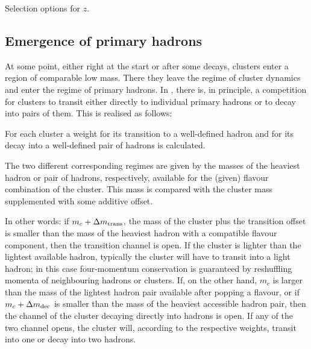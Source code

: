 \documentclass[a4paper,fleqn,10pt]{article}
\begin{document}
\begin{appendix}
\begin{table}[h!]
\begin{center}
    \parbox{12cm}{\caption{Selection options for $z$.}}
  \end{center}
\end{table}

\subsection{Emergence of primary hadrons}
\label{Sec::hadronemergence}

At some point, either right at the start or after some decays, clusters
enter a region of comparable low mass.  There they leave the regime of cluster
dynamics and enter the regime of primary hadrons.  In \Ahadic, there is, 
in principle, a competition for clusters to transit either directly to
individual primary hadrons or to decay into pairs of them.  This is
realised as follows:

For each cluster a weight for its transition to a well-defined hadron and for 
its decay into a well-defined pair of hadrons is calculated.  

The two different corresponding regimes are given by the masses of the 
heaviest hadron or pair of hadrons, respectively, available for the (given) 
flavour combination of the cluster.  This mass is compared with  the cluster
mass supplemented with some additive offset.  

In other words: if $m_c+\Delta m_{\rm trans}$, the mass of the cluster plus
the transition offset is smaller than the mass of the heaviest hadron with a
compatible flavour component, then the transition channel is open.  If the
cluster is lighter than the lightest available hadron, typically the cluster 
will have to transit into a light hadron; in this case four-momentum
conservation is guaranteed by reshuffling momenta of neighbouring hadrons or
clusters.  If, on the other hand, $m_c$ is larger than the mass of the lightest
hadron pair available after popping a flavour, or if $m_c+\Delta m_{\rm dec}$ 
is smaller than the mass of the heaviest accessible hadron pair, then the 
channel of the cluster decaying directly into hadrons is open.  If any of the
two channel opens, the cluster will, according to the respective weights,
transit into one or decay into two hadrons.
  

\end{appendix}
\end{document}
